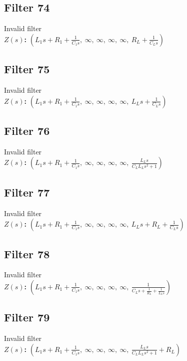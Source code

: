 \documentclass{article}
\begin{document}
\subsection*{Filter 74}
Invalid filter \\ 
\textbf{$Z(s)$:} $\left( L_{1} s + R_{1} + \frac{1}{C_{1} s}, \  \infty, \  \infty, \  \infty, \  \infty, \  R_{L} + \frac{1}{C_{L} s}\right)$ \\ 
\subsection*{Filter 75}
Invalid filter \\ 
\textbf{$Z(s)$:} $\left( L_{1} s + R_{1} + \frac{1}{C_{1} s}, \  \infty, \  \infty, \  \infty, \  \infty, \  L_{L} s + \frac{1}{C_{L} s}\right)$ \\ 
\subsection*{Filter 76}
Invalid filter \\ 
\textbf{$Z(s)$:} $\left( L_{1} s + R_{1} + \frac{1}{C_{1} s}, \  \infty, \  \infty, \  \infty, \  \infty, \  \frac{L_{L} s}{C_{L} L_{L} s^{2} + 1}\right)$ \\ 
\subsection*{Filter 77}
Invalid filter \\ 
\textbf{$Z(s)$:} $\left( L_{1} s + R_{1} + \frac{1}{C_{1} s}, \  \infty, \  \infty, \  \infty, \  \infty, \  L_{L} s + R_{L} + \frac{1}{C_{L} s}\right)$ \\ 
\subsection*{Filter 78}
Invalid filter \\ 
\textbf{$Z(s)$:} $\left( L_{1} s + R_{1} + \frac{1}{C_{1} s}, \  \infty, \  \infty, \  \infty, \  \infty, \  \frac{1}{C_{L} s + \frac{1}{R_{L}} + \frac{1}{L_{L} s}}\right)$ \\ 
\subsection*{Filter 79}
Invalid filter \\ 
\textbf{$Z(s)$:} $\left( L_{1} s + R_{1} + \frac{1}{C_{1} s}, \  \infty, \  \infty, \  \infty, \  \infty, \  \frac{L_{L} s}{C_{L} L_{L} s^{2} + 1} + R_{L}\right)$ \\ 
\end{document}
